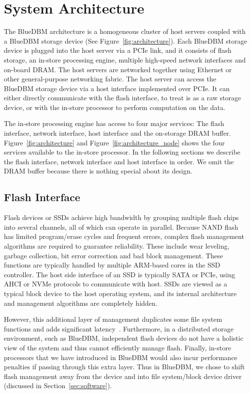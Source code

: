 \section{System Architecture}
\label{sec:architecture}


The BlueDBM architecture is a homogeneous cluster of host servers coupled
with a BlueDBM storage device (See Figure~\ref{fig:architecture}). Each BlueDBM storage device is plugged into
the host server via a PCIe link, and it consists of flash storage, an in-store
processing engine, multiple high-speed network interfaces and on-board DRAM. The host
servers are networked together using Ethernet or other general-purpose
networking fabric. The host server can access the BlueDBM storage device via
a host interface implemented over PCIe. It can either directly communicate with
the flash interface, to treat is as a raw storage device, or with the in-store
processor to perform computation on the data.

The in-store processing engine has access to four major services: The flash
interface, network interface, host interface and the on-storage DRAM buffer.
Figure~\ref{fig:architecture} and Figure~\ref{fig:architecture_node} shows the four services available to the
in-store processor. In the following sections we describe the flash interface,
network interface and host interface in order. We omit the DRAM buffer because there is nothing special about its design.

\subsection{Flash Interface}
\label{sec:flashInterface}

Flash devices or SSDs achieve high bandwidth by grouping multiple flash chips
into several channels, all of which can operate in parallel. Because NAND flash
has limited program/erase cycles and frequent errors, complex flash management
algorithms are required to guarantee reliability. These include wear leveling,
garbage collection, bit error correction and bad block management. These
functions are typically handled by multiple ARM-based cores in the SSD
controller. The host side interface of an SSD is typically SATA or PCIe, using
AHCI or NVMe protocols to communicate with host. SSDs are viewed
as a typical block device to the host operating system, and its internal
architecture and management algorithms are completely hidden. 

However, this additional layer of management duplicates some file system functions and adds significant latency~\cite{rfs}.
Furthermore, in a distributed storage environment, such as BlueDBM,
independent flash devices do not have a holistic view of the system and thus
cannot efficiently manage flash. Finally, in-store processors that we have
introduced in BlueDBM would also incur performance penalties if passing
through this extra layer. Thus in BlueDBM, we chose to shift flash management
away from the device and into file system/block device driver (discussed in
Section~\ref{sec:software}).

